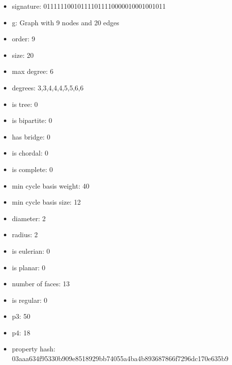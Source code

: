 \newpage
\begin{figure}
\end{figure}
\begin{itemize}
\item signature: 011111100101111011110000010001001011
\item g: Graph with 9 nodes and 20 edges
\item order: 9
\item size: 20
\item max degree: 6
\item degrees: 3,3,4,4,4,5,5,6,6
\item is tree: 0
\item is bipartite: 0
\item has bridge: 0
\item is chordal: 0
\item is complete: 0
\item min cycle basis weight: 40
\item min cycle basis size: 12
\item diameter: 2
\item radius: 2
\item is eulerian: 0
\item is planar: 0
\item number of faces: 13
\item is regular: 0
\item p3: 50
\item p4: 18
\item property hash: 03aaa634f95330b909e8518929bb74055a4ba4b893687866f7296dc170e635b9
\end{itemize}
